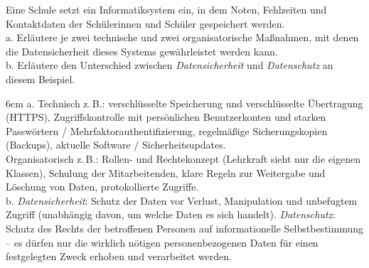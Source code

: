 \question[4]
Eine Schule setzt ein Informatiksystem ein, in dem Noten, Fehlzeiten und Kontaktdaten der
Schülerinnen und Schüler gespeichert werden. \\
a. Erläutere je zwei technische und zwei organisatorische Maßnahmen, mit denen die Datensicherheit
dieses Systems gewährleistet werden kann. \\
b. Erläutere den Unterschied zwischen \textit{Datensicherheit} und \textit{Datenschutz} an diesem Beispiel.

\begin{solutionbox}{6cm}
a. Technisch z.\,B.: verschlüsselte Speicherung und verschlüsselte Übertragung (HTTPS),
Zugriffskontrolle mit persönlichen Benutzerkonten und starken Passwörtern / Mehrfaktor\-authentifizierung,
regelmäßige Sicherungskopien (Backups), aktuelle Software / Sicherheitsupdates. \\
Organisatorisch z.\,B.: Rollen- und Rechtekonzept (Lehrkraft sieht nur die eigenen Klassen),
Schulung der Mitarbeitenden, klare Regeln zur Weitergabe und Löschung von Daten, protokollierte
Zugriffe. \\
b. \textit{Datensicherheit}: Schutz der Daten vor Verlust, Manipulation und unbefugtem Zugriff
(unabhängig davon, um welche Daten es sich handelt). \textit{Datenschutz}: Schutz des Rechts der
betroffenen Personen auf informationelle Selbstbestimmung -- es dürfen nur die wirklich nötigen
personenbezogenen Daten für einen festgelegten Zweck erhoben und verarbeitet werden.
\end{solutionbox}
